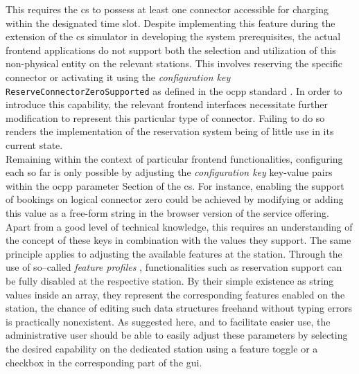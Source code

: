 This requires the \acrshort{cs} to possess at least one connector accessible for charging within the designated time slot.
Despite implementing this feature during the extension of the \acrshort{cs} simulator in developing the system prerequisites, the actual frontend applications do not support both the selection and utilization of this non-physical entity on the relevant stations.
This involves reserving the specific connector or activating it using the \textit{configuration key} \texttt{ReserveConnectorZeroSupported} as defined in the \acrshort{ocpp} standard \cite{noauthor_ocpp_nodate}.
In order to introduce this capability, the relevant frontend interfaces necessitate further modification to represent this particular type of connector. Failing to do so renders the implementation of the reservation system being of little use in its current state. \\
Remaining within the context of particular frontend functionalities, configuring each  so far is only possible by adjusting the \textit{configuration key} key-value pairs within the \acrshort{ocpp} parameter Section of the \acrshort{cs}.
For instance, enabling the support of bookings on logical connector zero could be achieved by modifying or adding this value as a free-form string in the browser version of the service offering. 
Apart from a good level of technical knowledge, this requires an understanding of the concept of these keys in combination with the values they support. 
The same principle applies to adjusting the available features at the station. Through the use of so--called \textit{feature profiles} \cite{noauthor_ocpp_nodate}, functionalities such as reservation support can be fully disabled at the respective station.
By their simple existence as string values inside an array, they represent the corresponding features enabled on the station, the chance of editing such data structures freehand without typing errors is practically nonexistent.
As suggested here, and to facilitate easier use, the administrative user should be able to easily adjust these parameters by selecting the desired capability on the dedicated station using a feature toggle or a checkbox in the corresponding part of the \acrshort{gui}. \\
